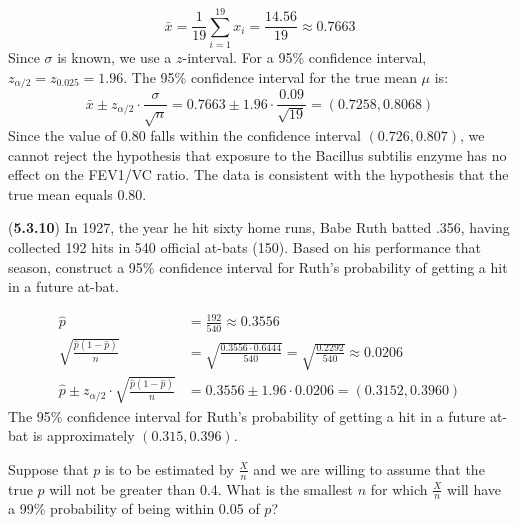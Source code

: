 \documentclass{article}
\begin{document}
\begin{probset}
\begin{prob}
\begin{subprobset}
\begin{subprob}
    \begin{soln}
        \[
            \bar{x} = \frac{1}{19}\sum_{i=1}^{19} x_i = \frac{14.56}{19} \approx 0.7663
        \]
        Since $\sigma$ is known, we use a $z$-interval. For a 95\% confidence interval, $z_{\alpha/2} = z_{0.025} = 1.96$. The 95\% confidence interval for the true mean $\mu$ is:
        \[
            \bar{x} \pm z_{\alpha/2} \cdot \frac{\sigma}{\sqrt{n}} = 0.7663 \pm 1.96 \cdot \frac{0.09}{\sqrt{19}} = (0.7258, 0.8068)
        \]
        Since the value of 0.80 falls within the confidence interval $(0.726, 0.807)$, we cannot reject the hypothesis that exposure to the Bacillus subtilis enzyme has no effect on the FEV1/VC ratio. The data is consistent with the hypothesis that the true mean equals 0.80.
    \end{soln}
    \end{subprob}

    \newpage

    \begin{subprob}
        (\textbf{5.3.10}) In 1927, the year he hit sixty home runs, Babe Ruth batted .356, having collected 192 hits in 540 official at-bats (150). Based on his performance that season, construct a 95\% confidence interval for Ruth's probability of getting a hit in a future at-bat.

        \begin{soln}
            \begin{align*}
                \hat{p} &= \frac{192}{540} \approx 0.3556 \\
                \sqrt{\frac{\hat{p}(1-\hat{p})}{n}} &= \sqrt{\frac{0.3556 \cdot 0.6444}{540}} = \sqrt{\frac{0.2292}{540}} \approx 0.0206 \\
                \hat{p} \pm z_{\alpha/2} \cdot \sqrt{\frac{\hat{p}(1-\hat{p})}{n}} &= 0.3556 \pm 1.96 \cdot 0.0206 = (0.3152, 0.3960)
            \end{align*}
            The 95\% confidence interval for Ruth's probability of getting a hit in a future at-bat is approximately $(0.315, 0.396)$.
        \end{soln}
    \end{subprob}
    \end{subprobset}
\end{prob}

\begin{prob}[\textbf{5.3.26}]
    Suppose that $p$ is to be estimated by $\frac{X}{n}$ and we are willing to assume that the true $p$ will not be greater than 0.4. What is the smallest $n$ for which $\frac{X}{n}$ will have a 99\% probability of being within 0.05 of $p$?


\end{prob}
\end{probset}
\end{document}
